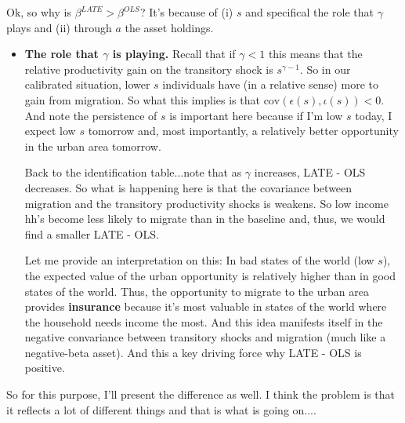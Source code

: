 \documentclass[pdftex,11pt]{article}
\begin{document}
Ok, so why is $\beta^{LATE} > \beta^{OLS}$? It's because of (i) $s$ and specifical the role that $\gamma$ plays and (ii) through $a$ the asset holdings. 
\begin{itemize}
\item \textbf{The role that $\gamma$ is playing.} Recall that if $\gamma < 1$  this means that the relative productivity gain on the transitory shock is $s^{\gamma - 1}$. So in our calibrated situation, lower $s$ individuals have (in a relative sense) more to gain from migration. So what this implies is that $\mathrm{cov}( \epsilon(s), \iota(s)) < 0$. And note the persistence of $s$ is important here because if I'm low $s$ today, I expect low $s$ tomorrow and, most importantly, a relatively better opportunity in the urban area tomorrow.
    
    Back to the identification table...note that as $\gamma$ increases, LATE - OLS decreases. So what is happening here is that the covariance between migration and the transitory productivity shocks is weakens. So low income hh's become less likely to migrate than in the baseline and, thus, we would find a smaller LATE - OLS.
    
    Let me provide an interpretation on this: In bad states of the world (low $s$), the expected value of the urban opportunity is relatively higher than in good states of the world. Thus, the opportunity to migrate to the urban area provides \textbf{insurance} because it's most valuable in states of the world where the household needs income the most. And this idea manifests itself in the negative convariance between transitory shocks and migration (much like a negative-beta asset). And this a key driving force why LATE - OLS is positive.

\end{itemize}

So for this purpose, I'll present the difference as well. I think the problem is that it reflects a lot of different things and that is what is going on.... \\
\end{document}
